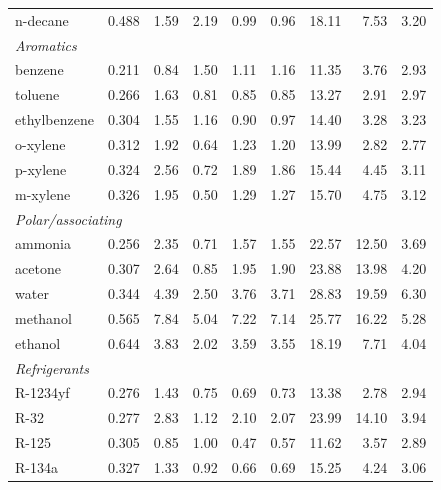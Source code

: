 \begin{table}[H]
\begin{tabular}{lrrrrrrrr}
\quad n-decane & 0.488 & 1.59 & 2.19 & 0.99 & 0.96 & 18.11 & 7.53 & 3.20 \\
\multicolumn{9}{l}{\itshape Aromatics}\\
\quad benzene & 0.211 & 0.84 & 1.50 & 1.11 & 1.16 & 11.35 & 3.76 & 2.93 \\
\quad toluene & 0.266 & 1.63 & 0.81 & 0.85 & 0.85 & 13.27 & 2.91 & 2.97 \\
\quad ethylbenzene & 0.304 & 1.55 & 1.16 & 0.90 & 0.97 & 14.40 & 3.28 & 3.23 \\
\quad o-xylene & 0.312 & 1.92 & 0.64 & 1.23 & 1.20 & 13.99 & 2.82 & 2.77 \\
\quad p-xylene & 0.324 & 2.56 & 0.72 & 1.89 & 1.86 & 15.44 & 4.45 & 3.11 \\
\quad m-xylene & 0.326 & 1.95 & 0.50 & 1.29 & 1.27 & 15.70 & 4.75 & 3.12 \\
\multicolumn{9}{l}{\itshape Polar/associating}\\
\quad ammonia & 0.256 & 2.35 & 0.71 & 1.57 & 1.55 & 22.57 & 12.50 & 3.69 \\
\quad acetone & 0.307 & 2.64 & 0.85 & 1.95 & 1.90 & 23.88 & 13.98 & 4.20 \\
\quad water & 0.344 & 4.39 & 2.50 & 3.76 & 3.71 & 28.83 & 19.59 & 6.30 \\
\quad methanol & 0.565 & 7.84 & 5.04 & 7.22 & 7.14 & 25.77 & 16.22 & 5.28 \\
\quad ethanol & 0.644 & 3.83 & 2.02 & 3.59 & 3.55 & 18.19 & 7.71 & 4.04 \\
\multicolumn{9}{l}{\itshape Refrigerants}\\
\quad R-1234yf & 0.276 & 1.43 & 0.75 & 0.69 & 0.73 & 13.38 & 2.78 & 2.94 \\
\quad R-32 & 0.277 & 2.83 & 1.12 & 2.10 & 2.07 & 23.99 & 14.10 & 3.94 \\
\quad R-125 & 0.305 & 0.85 & 1.00 & 0.47 & 0.57 & 11.62 & 3.57 & 2.89 \\
\quad R-134a & 0.327 & 1.33 & 0.92 & 0.66 & 0.69 & 15.25 & 4.24 & 3.06 \\
\bottomrule
\end{tabular}
\end{table}

